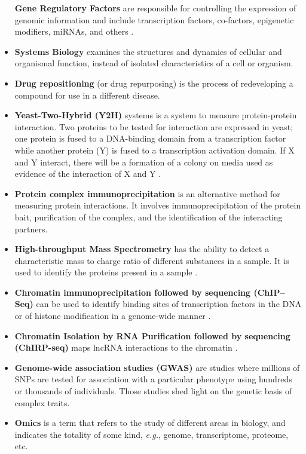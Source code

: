 \documentclass[
]{book}
\begin{document}
\begin{itemize}
  \textbf{Gene Regulatory Factors} are responsible for controlling the expression of genomic information and include transcription factors, co-factors, epigenetic modifiers, miRNAs, and others \citep{Hobert2008GeneMicroRNAs}.
\item
  \textbf{Systems Biology} examines the structures and dynamics of cellular and organismal function, instead of isolated characteristics of a cell or organism.
\item
  \textbf{Drug repositioning} (or drug repurposing) is the process of redeveloping a compound for use in a different disease.
\item
  \textbf{Yeast-Two-Hybrid (Y2H)} systems is a system to measure protein-protein interaction. Two proteins to be tested for interaction are expressed in yeast; one protein is fused to a DNA-binding domain from a transcription factor while another protein (Y) is fused to a transcription activation domain. If X and Y interact, there will be a formation of a colony on media used as evidence of the interaction of X and Y \citep{Parrish2006YeastMapping}.
\item
  \textbf{Protein complex immunoprecipitation} is an alternative method for measuring protein interactions. It involves immunoprecipitation of the protein bait, purification of the complex, and the identification of the interacting partners.
\item
  \textbf{High-throughput Mass Spectrometry} has the ability to detect a characteristic mass to charge ratio of different substances in a sample. It is used to identify the proteins present in a sample \citep{Kempa2019HighAnalysis}.
\item
  \textbf{Chromatin immunoprecipitation followed by sequencing (ChIP--Seq)} can be used to identify binding sites of transcription factors in the DNA or of histone modification in a genome-wide manner \citep{Park2009ChIP-seq:Technology}.
\item
  \textbf{Chromatin Isolation by RNA Purification followed by sequencing (ChIRP-seq)} maps lncRNA interactions to the chromatin \citep{Park2009ChIP-seq:Technology}.
\item
  \textbf{Genome-wide association studies (GWAS)} are studies where millions of SNPs are tested for association with a particular phenotype using hundreds or thousands of individuals. Those studies shed light on the genetic basis of complex traits.
\item
  \textbf{Omics} is a term that refers to the study of different areas in biology, and indicates the totality of some kind, \emph{e.g.}, genome, transcriptome, proteome, etc.
\end{itemize}
\end{document}
